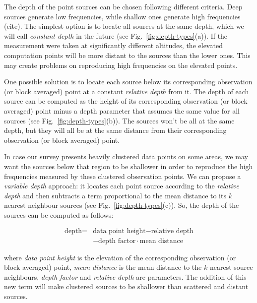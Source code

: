 \documentclass[twocolumn]{article}
\begin{document}
The depth of the point sources can be chosen following different criteria.
Deep sources generate low frequencies, while shallow ones generate high
frequencies (cite).
The simplest option is to locate all sources at the same depth, which we will
call \emph{constant depth} in the future (see Fig.~\ref{fig:depth-types}(a)).
If the measurement were taken at significantly different altitudes, the
elevated computation points will be more distant to the sources than the lower
ones.
This may create problems on reproducing high frequencies on the elevated
points.

One possible solution is to locate each source below its corresponding
observation (or block averaged) point at a constant \emph{relative depth}
from it.
The depth of each source can be computed as the height of its corresponding
observation (or block averaged) point minus a depth parameter that assumes the
same value for all sources (see Fig.~\ref{fig:depth-types}(b)).
The sources won't be all at the same depth, but they will all be at the same
distance from their corresponding observation (or block averaged) point.

In case our survey presents heavily clustered data points on some areas, we may
want the sources below that region to be shallower in order to reproduce the
high frequencies measured by these clustered observation points.
We can propose a \emph{variable depth} approach: it locates each point source
according to the \emph{relative depth} and then subtracts a term proportional
to the mean distance to its $k$ nearest neighbour sources
(see Fig.~\ref{fig:depth-types}(c)).
So, the depth of the sources can be computed as follows:

\begin{equation}
    \begin{split}
        \textrm{depth} =
           &\textrm{data point height} - \textrm{relative depth} \\
           &- \textrm{depth factor} \cdot \textrm{mean distance}
    \end{split}
\end{equation}

\noindent where \emph{data point height} is the elevation of the corresponding
observation (or block averaged) point, \emph{mean distance} is the mean
distance to the $k$ nearest source neighbours, \emph{depth factor} and
\emph{relative depth} are parameters.
The addition of this new term will make clustered sources to be shallower than
scattered and distant sources.
\end{document}
